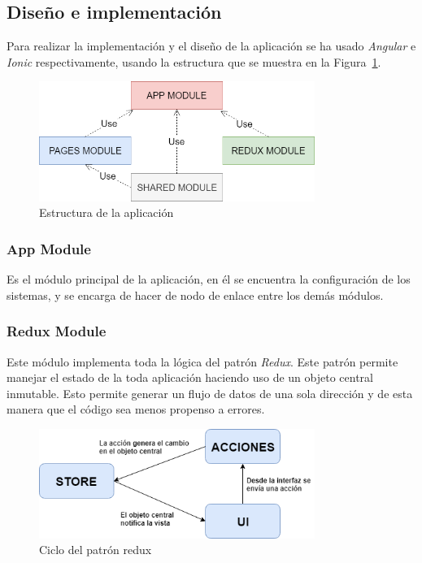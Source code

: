 \subsection{Diseño e implementación}
Para realizar la implementación y el diseño de la aplicación se ha usado \textit{Angular} e \textit{Ionic} respectivamente, usando la estructura que se muestra en la Figura~\ref{fig:app_schema}.
 \begin{figure}[h]
    \centering
    \includegraphics[width=0.8\textwidth, keepaspectratio]{imaxes/APP_SCHEMA.png}
    \caption{Estructura de la aplicación}
    \label{fig:app_schema}
\end{figure}
 
 \subsubsection{App Module}
 Es el módulo principal de la aplicación, en él se encuentra la configuración de los sistemas, y se encarga de hacer de nodo de enlace entre los demás módulos.
 
 
 \subsubsection{Redux Module}
Este módulo implementa toda la lógica del patrón \textit{Redux}. Este patrón permite manejar el estado de la toda aplicación haciendo uso de un objeto central inmutable. Esto permite generar un flujo de datos de una sola dirección y de esta manera que el código sea menos propenso a errores.
 
  \begin{figure}[h]
    \centering
    \includegraphics[width=0.8\textwidth, keepaspectratio]{imaxes/redux_simple.png}
    \caption{Ciclo del patrón redux}
    \label{fig:redux_simple}
\end{figure}
 
